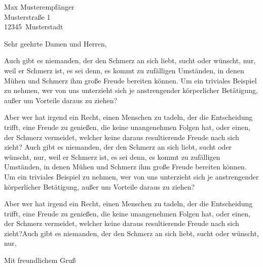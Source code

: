 \documentclass[letter]{scrlttr2}
\date{\today}
\begin{document}
\begin{letter}{Max Musterempfänger\\Musterstraße 1\\12345~Musterstadt}

\opening{Sehr geehrte Damen und Herren,}

Auch gibt es niemanden, der den Schmerz an sich liebt, sucht oder wünscht, nur, weil er Schmerz ist, es sei denn, es
kommt zu zufälligen Umständen, in denen Mühen und Schmerz ihm große Freude bereiten können. Um ein triviales Beispiel zu
nehmen, wer von uns unterzieht sich je anstrengender körperlicher Betätigung, außer um Vorteile daraus zu ziehen?

Aber wer hat irgend ein Recht, einen Menschen zu tadeln, der die Entscheidung trifft, eine Freude zu genießen, die keine
unangenehmen Folgen hat, oder einen, der Schmerz vermeidet, welcher keine daraus resultierende Freude nach sich zieht?
Auch gibt es niemanden, der den Schmerz an sich liebt, sucht oder wünscht, nur, weil er Schmerz ist, es sei denn, es
kommt zu zufälligen Umständen, in denen Mühen und Schmerz ihm große Freude bereiten können. Um ein triviales Beispiel zu
nehmen, wer von uns unterzieht sich je anstrengender körperlicher Betätigung, außer um Vorteile daraus zu ziehen?

Aber wer hat irgend ein Recht, einen Menschen zu tadeln, der die Entscheidung trifft, eine Freude zu genießen, die keine
unangenehmen Folgen hat, oder einen, der Schmerz vermeidet, welcher keine daraus resultierende Freude nach sich
zieht?Auch gibt es niemanden, der den Schmerz an sich liebt, sucht oder wünscht, nur,

\closing{Mit freundlichem Gruß}

\end{letter}
\end{document}

